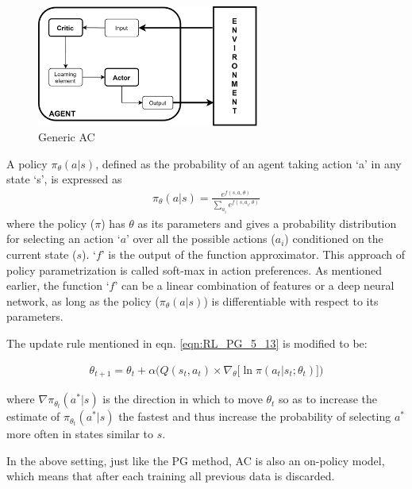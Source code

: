 \begin{figure}[h!]
    \centering
    \includegraphics[width=0.65\textwidth]{Figures/Ch_RL/AC_generic.png}
    \caption{Generic AC}
    \label{fig:RL_AC_generic}
\end{figure}

A policy $\pi_{\theta}(a|s)$, defined as the probability of an agent taking action `a' in any state `s', is expressed as 
\begin{align}
    \pi_{\theta}(a|s) = \frac{e^{f(s, a, \theta)}}{\sum_{a_i} e^{f(s, a_i, \theta)}} \label{eqn:RL_A2C_probabilistic}
\end{align}
where the policy ($\pi$) has $\theta$ as its parameters and gives a probability distribution for selecting an action `$a$' over all the possible actions ($a_i$) conditioned on the current state ($s$). `$f$' is the output of the function approximator. This approach of policy parametrization is called soft-max \parencite{goodfellow2016deep} in action preferences. As mentioned earlier, the function `$f$' can be a linear combination of features or a deep neural network, as long as the policy ($\pi_{\theta}(a|s)$) is differentiable with respect to its parameters.

The update rule mentioned in eqn. \ref{eqn:RL_PG_5_13} is modified to be:

\begin{align}
    \theta_{t+1} = \theta_t + \alpha \Big(Q(s_t, a_t) \times \nabla_{\theta} \Big[ \ln \pi(a_t | s_t; \theta_t) \Big] \Big) \label{eqn:AC_update_with_Q_value}
\end{align}

where $\nabla \pi_{\theta_{t}} (a^*|s)$ is the direction in which to move $\theta_t$ so as to increase the estimate of $\pi_{\theta_{t}} (a^*|s)$ the fastest and thus increase the probability of selecting $a^*$ more often in states similar to $s$.

In the above setting, just like the PG method, AC is also an on-policy model, which means that after each training all previous data is discarded. 

